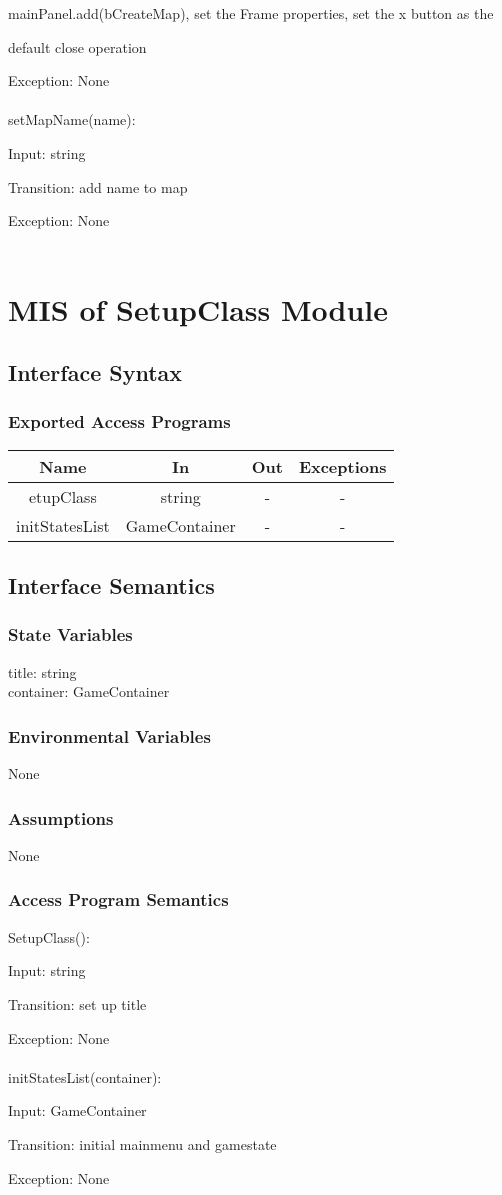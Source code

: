 \documentclass[12,english]{article}
\begin{document}
		mainPanel.add(bCreateMap), set the Frame properties, set the x button as the 
		
		default close operation
		
		Exception: None\\
		\\
		setMapName(name):
		
		Input: string
		
		Transition: add name to map
		
		Exception: None\\
		\\
\section{MIS of SetupClass Module}
	\subsection{Interface Syntax}
		\subsubsection{Exported Access Programs}
		
	\begin{tabular}[pos]{|c|c|c|c|}
	\hline
	\textbf{Name}& \textbf{In} & \textbf{Out} & \textbf{Exceptions} \\ 
	\hline
	etupClass & string & - & - \\ \hline
	initStatesList & GameContainer& - & - \\ \hline

					
	\end{tabular}		
		
	\subsection{Interface Semantics}
		\subsubsection{State Variables}
		title: string\\
		container: GameContainer\\ 
	    
		\subsubsection{Environmental Variables}
		None
		\subsubsection{Assumptions}
        None

		\subsubsection{Access Program Semantics}
		SetupClass():
		
		Input: string
		
		Transition: set up title 
		
		Exception: None\\
		\\
		initStatesList(container):
		
		Input: GameContainer
		
		Transition: initial mainmenu and gamestate
		
		Exception: None\\
		\\	
		
\end{document}

